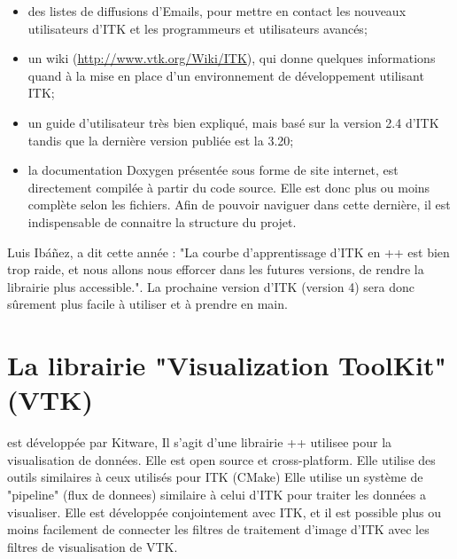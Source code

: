 \begin{itemize}
  \item des listes de diffusions d'Emails, pour mettre en contact les nouveaux utilisateurs d'ITK et les programmeurs et utilisateurs avancés;
  \item un wiki (\url{http://www.vtk.org/Wiki/ITK}), qui donne quelques informations quand à la mise en place d'un environnement de développement utilisant ITK;
  \item un guide d'utilisateur\cite{ITKSoftwareGuide} très bien expliqué, mais basé sur la version 2.4 d'ITK tandis que la dernière version publiée est la 3.20;
  \item la documentation Doxygen présentée sous forme de site internet, est directement compilée à partir du code source. Elle est donc plus ou moins complète selon les fichiers. Afin de pouvoir naviguer dans cette dernière, il est indispensable de connaitre la structure du projet.
\end{itemize}
Luis Ibáñez, a dit cette année : "La courbe d'apprentissage d'ITK en \C++ est bien trop raide, et nous allons nous efforcer dans les futures versions, de rendre la librairie plus accessible.". La prochaine version d'ITK (version 4) sera donc sûrement plus facile à utiliser et à prendre en main.

\section*{La librairie "Visualization ToolKit" (VTK)} est développée par Kitware, Il s'agit d'une librairie \C++ utilisee pour la visualisation de données. Elle est open source et cross-platform. Elle utilise des outils similaires à ceux utilisés pour ITK (CMake)
Elle utilise un système de "pipeline" (flux de donnees) similaire à celui d'ITK pour traiter les données a visualiser. Elle est développée conjointement avec ITK, et il est possible plus ou moins facilement de connecter les filtres de traitement d'image d'ITK avec les filtres de visualisation de VTK.

